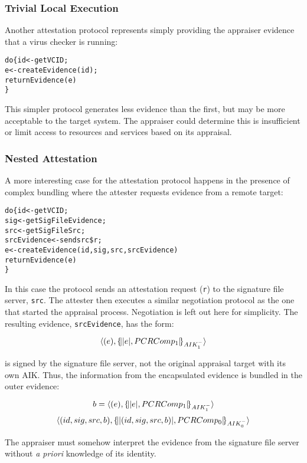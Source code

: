 \documentclass[10pt]{article}
\begin{document}
\subsubsection*{Trivial Local Execution}

Another attestation protocol represents simply providing the appraiser
evidence that a virus checker is running:

\begin{alltt}
  do \{ id <- getVCID;
       e <- createEvidence(id);
       returnEvidence(e)
  \}
\end{alltt}

This simpler protocol generates less evidence than the first, but may
be more acceptable to the target system.  The appraiser could
determine this is insufficient or limit access to resources and
services based on its appraisal.

\subsubsection*{Nested Attestation}

A more interesting case for the attestation protocol happens in the
presence of complex bundling where the attester requests evidence from
a remote target:

\begin{alltt}
  do \{ id <- getVCID;
       sig <- getSigFileEvidence;
       src <- getSigFileSrc;
       srcEvidence <- send src \$ r;
       e <- createEvidence(id,sig,src,srcEvidence)
       returnEvidence(e)
  \}
\end{alltt}

In this case the protocol sends an attestation request (\Verb+r+) to
the signature file server, \Verb+src+. The attester then executes a
similar negotiation protocol as the one that started the appraisal
process.  Negotiation is left out here for simplicity.  The resulting
evidence, \Verb+srcEvidence+, has the form:

\[\langle (e),\{\!\lvert \lvert e \rvert,PCRComp_1\rvert\!\}_{AIK_1^{-}}\rangle\]

is signed by the signature file server, not the original appraisal
target with its own AIK. Thus, the information from the encapsulated
evidence is bundled in the outer evidence:

\[b=\langle (e),\{\!\lvert \lvert e \rvert,PCRComp_1\rvert\!\}_{AIK_1^{-}}\rangle\]
\[\langle (id,sig,src,b),\{\!\lvert \lvert (id,sig,src,b) \rvert,PCRComp_0\rvert\!\}_{AIK_0^{-}}\rangle\]

The appraiser must somehow interpret the evidence from the signature
file server without \emph{a priori} knowledge of its identity.
\end{document}
